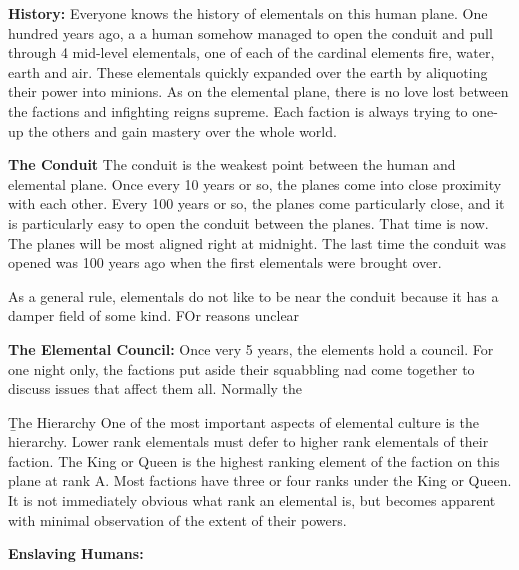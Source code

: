 \documentclass[blue]{elementals}
\begin{document}
\name{\bTest{}}

{\bf History:}
Everyone knows the history of elementals on this human plane. One hundred years ago, a a human somehow managed to open the conduit and pull through 4 mid-level elementals, one of each of the cardinal elements fire, water, earth and air. These elementals quickly expanded over the earth by aliquoting their power into minions. As on the elemental plane, there is no love lost between the factions and infighting reigns supreme. Each faction is always trying to one-up the others and gain mastery over the whole world.

{\bf The Conduit}
The conduit is the weakest point between the human and elemental plane. Once every 10 years or so, the planes come into close proximity with each other. Every 100 years or so, the planes come particularly close, and it is particularly easy to open the conduit between the planes. That time is now. The planes will be most aligned right at midnight. The last time the conduit was opened was 100 years ago when the first elementals were brought over.

As a general rule, elementals do not like to be near the conduit because it has a damper field of some kind. FOr reasons unclear

{\bf The Elemental Council:}
Once very 5 years, the elements hold a council. For one night only, the factions put aside their squabbling nad come together to discuss issues that affect them all. Normally the 

{\b{The Hierarchy}}
One of the most important aspects of elemental culture is the hierarchy. Lower rank elementals must defer to higher rank elementals of their faction. The King or Queen is the highest ranking element of the faction on this plane at rank A. Most factions have three or four ranks under the King or Queen. It is not immediately obvious what rank an elemental is, but becomes apparent with minimal observation of the extent of their powers.

{\bf Enslaving Humans:}
\end{document}
